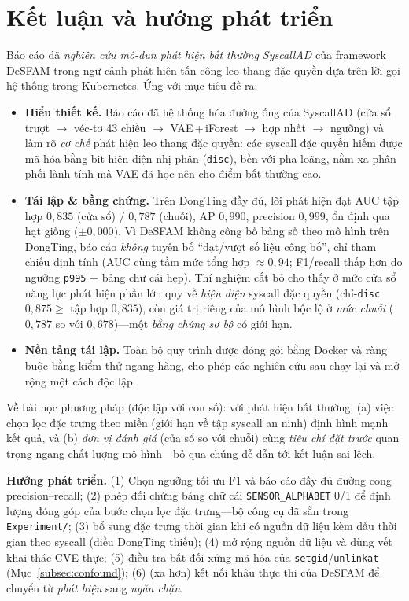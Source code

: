 \section{Kết luận và hướng phát triển}
\label{sec:conclusion}

Báo cáo đã \emph{nghiên cứu mô-đun phát hiện bất thường SyscallAD} của framework
DeSFAM trong ngữ cảnh phát hiện tấn công leo thang đặc quyền dựa trên lời gọi hệ
thống trong Kubernetes. Ứng với mục tiêu đề ra:

\begin{itemize}[leftmargin=1.8em]
  \item \textbf{Hiểu thiết kế.} Báo cáo đã hệ thống hóa đường ống của SyscallAD (cửa
        sổ trượt $\to$ véc-tơ 43 chiều $\to$ VAE\,+\,iForest $\to$ hợp nhất $\to$
        ngưỡng) và làm rõ \emph{cơ chế} phát hiện leo thang đặc quyền: các syscall
        đặc quyền hiếm được mã hóa bằng bit hiện diện nhị phân (\texttt{disc}), bền
        với pha loãng, nằm xa phân phối lành tính mà VAE đã học nên cho điểm bất
        thường cao.
  \item \textbf{Tái lập \& bằng chứng.} Trên DongTing đầy đủ, lõi phát hiện đạt AUC
        tập hợp $0{,}835$ (cửa sổ) / $0{,}787$ (chuỗi), AP $0{,}990$, precision
        $0{,}999$, ổn định qua hạt giống ($\pm 0{,}000$). Vì DeSFAM không công bố bảng
        số theo mô hình trên DongTing, báo cáo \emph{không} tuyên bố ``đạt/vượt số
        liệu công bố'', chỉ tham chiếu định tính (AUC cùng tầm mức tổng hợp
        $\approx 0{,}94$; F1/recall thấp hơn do ngưỡng \texttt{p995} + bảng chữ cái
        hẹp). Thí nghiệm cắt bỏ cho thấy ở mức cửa sổ năng lực phát hiện phần lớn quy
        về \emph{hiện diện} syscall đặc quyền (chỉ-\texttt{disc} $0{,}875 \ge$ tập hợp
        $0{,}835$), còn giá trị riêng của mô hình bộc lộ ở \emph{mức chuỗi} ($0{,}787$
        so với $0{,}678$)---một \emph{bằng chứng sơ bộ} có giới hạn.
  \item \textbf{Nền tảng tái lập.} Toàn bộ quy trình được đóng gói bằng Docker và
        ràng buộc bằng kiểm thử ngang hàng, cho phép các nghiên cứu sau chạy lại và
        mở rộng một cách độc lập.
\end{itemize}

Về bài học phương pháp (độc lập với con số): với phát hiện bất thường, (a) việc chọn
lọc đặc trưng theo miền (giới hạn về tập syscall an ninh) định hình mạnh kết quả, và
(b) \emph{đơn vị đánh giá} (cửa sổ so với chuỗi) cùng \emph{tiêu chí đặt trước} quan
trọng ngang chất lượng mô hình---bỏ qua chúng dễ dẫn tới kết luận sai lệch.

\textbf{Hướng phát triển.} (1) Chọn ngưỡng tối ưu F1 và báo cáo đầy đủ đường cong
precision--recall; (2) phép đối chứng bảng chữ cái \texttt{SENSOR\_ALPHABET} 0/1 để
định lượng đóng góp của bước chọn lọc đặc trưng---bộ công cụ đã sẵn trong
\texttt{Experiment/}; (3) bổ sung đặc trưng thời gian khi có nguồn dữ liệu kèm dấu
thời gian theo syscall (điều DongTing thiếu); (4) mở rộng nguồn dữ liệu và dùng vết
khai thác CVE thực; (5) điều tra bất đối xứng mã hóa của
\texttt{setgid}/\texttt{unlinkat} (Mục~\ref{subsec:confound}); (6) (xa hơn) kết nối
khâu thực thi của DeSFAM để chuyển từ \emph{phát hiện} sang \emph{ngăn chặn}.
